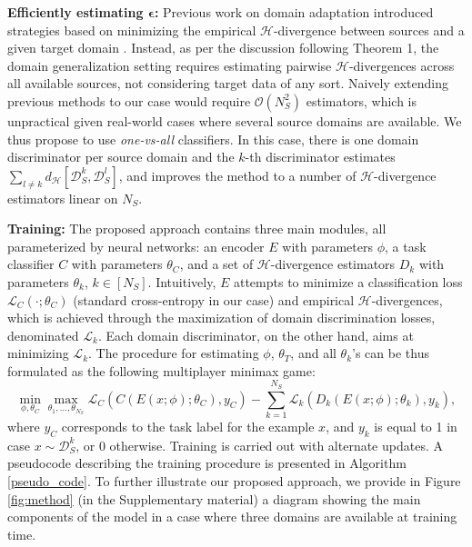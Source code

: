 \documentclass{article}
\begin{document}
\textbf{Efficiently estimating $\boldsymbol\epsilon$:} Previous work on domain adaptation introduced strategies based on minimizing the empirical $\mathcal{H}$-divergence between sources and a given target domain \cite{ganin2016domain, zhao2018adversarial}. Instead, as per the discussion following Theorem 1, the domain generalization setting requires estimating pairwise $\mathcal{H}$-divergences across all available sources, not considering target data of any sort. Naively extending previous methods to our case would require $\mathcal{O}(N_S^2)$ estimators, which is unpractical given real-world cases where several source domains are available. We thus propose to use {\em one-vs-all} classifiers. In this case, there is one domain discriminator per source domain and the $k$-th discriminator estimates $\sum_{l \neq k} d_{\mathcal{H}}[\mathcal{D}^k_S, \mathcal{D}^l_S]$, and improves the method to a number of $\mathcal{H}$-divergence estimators linear on $N_S$.

\textbf{Training:} 
The proposed approach contains three main modules, all parameterized by neural networks: an encoder $E$ with parameters $\phi$, a task classifier $C$ with parameters $\theta_C$, and a set of $\mathcal{H}$-divergence estimators $D_k$ with parameters $\theta_{k}$, $k\in[N_S]$. Intuitively, $E$ attempts to minimize a classification loss $\mathcal{L}_C(\cdot;\theta_C)$ (standard cross-entropy in our case) and empirical $\mathcal{H}$-divergences, which is achieved through the maximization of domain discrimination losses, denominated $\mathcal{L}_k$. Each domain discriminator, on the other hand, aims at minimizing $\mathcal{L}_k$. The procedure for estimating $\phi$, $\theta_T$, and all $\theta_{k}$'s can be thus formulated as the following multiplayer minimax game:   
\begin{equation}
        \min_{\phi, \theta_C} \max_{\theta_1, \ldots, \theta_{N_S}} \mathcal{L}_C (C(E(x; \phi); \theta_C), y_C) - \sum_{k=1}^{N_S} \mathcal{L}_k(D_k(E(x; \phi); \theta_k), y_{k}),
\label{eq:game}
\end{equation}
where $y_{C}$ corresponds to the task label for the example $x$, and $y_k$ is equal to 1 in case $x\sim\mathcal{D}^k_S$, or 0 otherwise. 
Training is carried out with alternate updates. A pseudocode describing the training procedure is presented in Algorithm \ref{pseudo_code}. To further illustrate our proposed approach, we provide in Figure \ref{fig:method} (in the Supplementary material) a diagram showing the main components of the model in a case where three domains are available at training time.
\end{document}
